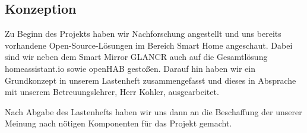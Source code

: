 \subsection{Konzeption}\label{zs_konzeption}
Zu Beginn des Projekts haben wir Nachforschung angestellt und uns bereits vorhandene Open-Source-Lösungen im Bereich Smart Home angeschaut.
Dabei sind wir neben dem Smart Mirror GLANCR auch auf die Gesamtlösung homeassistant.io sowie openHAB gestoßen. 
Darauf hin haben wir ein Grundkonzept in unserem Lastenheft zusammengefasst und dieses in Absprache mit unserem Betreuungslehrer, Herr Kohler, ausgearbeitet.\par
\noindent Nach Abgabe des Lastenhefts haben wir uns dann an die Beschaffung der unserer Meinung nach nötigen Komponenten für das Projekt gemacht.